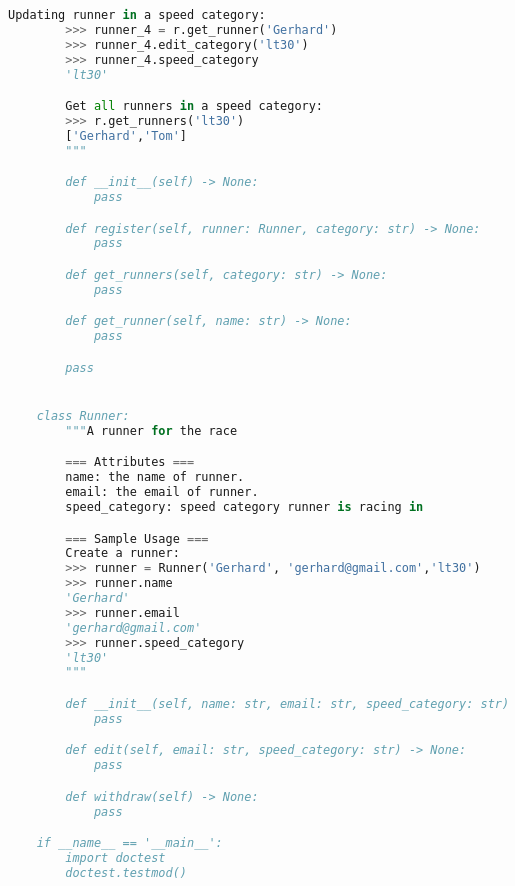\documentclass[12pt]{article}
\begin{document}
\begin{enumerate}[1.]
\begin{lstlisting}[language=Python]
        Updating runner in a speed category:
        >>> runner_4 = r.get_runner('Gerhard')
        >>> runner_4.edit_category('lt30')
        >>> runner_4.speed_category
        'lt30'

        Get all runners in a speed category:
        >>> r.get_runners('lt30')
        ['Gerhard','Tom']
        """

        def __init__(self) -> None:
            pass

        def register(self, runner: Runner, category: str) -> None:
            pass

        def get_runners(self, category: str) -> None:
            pass

        def get_runner(self, name: str) -> None:
            pass

        pass


    class Runner:
        """A runner for the race

        === Attributes ===
        name: the name of runner.
        email: the email of runner.
        speed_category: speed category runner is racing in

        === Sample Usage ===
        Create a runner:
        >>> runner = Runner('Gerhard', 'gerhard@gmail.com','lt30')
        >>> runner.name
        'Gerhard'
        >>> runner.email
        'gerhard@gmail.com'
        >>> runner.speed_category
        'lt30'
        """

        def __init__(self, name: str, email: str, speed_category: str) -> None:
            pass

        def edit(self, email: str, speed_category: str) -> None:
            pass

        def withdraw(self) -> None:
            pass

    if __name__ == '__main__':
        import doctest
        doctest.testmod()

\end{lstlisting}


\end{enumerate}
\end{document}
